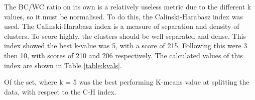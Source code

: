 \documentclass{article}
\begin{document}
\vspace{4mm}
The BC/WC ratio on its own is a relatively useless metric due to the different k values, so it must be normalised. To do this, the Calinski-Harabasz
index  was used. The Calinski-Harabasz index is a measure of separation and density of clusters. To score highly, the clusters should be well separated and
dense. This index showed the best k-value was 5, with a score of 215. Following this were 3 then 10, with scores of 210 and 206 respectively. The calculated values of this index are shown in Table \ref{table:kvals}.

Of the set, where k = 5 was the best performing K-means value at splitting the data, with respect to the C-H index. 

\vspace{4mm}



\end{document}
